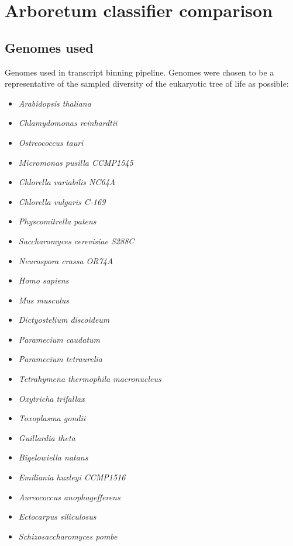 \section{Arboretum classifier comparison}

\subsection{Genomes used}\label{sec:appen_genomes}

Genomes used in transcript binning pipeline.
Genomes were chosen to be a representative of the sampled diversity of the 
eukaryotic tree of life as possible:
\begin{itemize}
    \item		\textit{Arabidopsis thaliana} 
    \item		\textit{Chlamydomonas reinhardtii} 
    \item		\textit{Ostreococcus tauri} 
    \item		\textit{Micromonas pusilla CCMP1545}   
    \item		\textit{Chlorella variabilis NC64A} 
    \item		\textit{Chlorella vulgaris C-169} 
    \item		\textit{Physcomitrella patens} 
    \item		\textit{Saccharomyces cerevisiae S288C}  
    \item		\textit{Neurospora crassa OR74A}
    \item		\textit{Homo sapiens}
    \item		\textit{Mus musculus}
    \item		\textit{Dictyostelium discoideum}
    \item		\textit{Paramecium caudatum}
    \item		\textit{Paramecium tetraurelia}
    \item		\textit{Tetrahymena thermophila macronucleus}
    \item		\textit{Oxytricha trifallax}
    \item		\textit{Toxoplasma gondii}
    \item		\textit{Guillardia theta}
    \item		\textit{Bigelowiella natans}
    \item		\textit{Emiliania huxleyi CCMP1516}
    \item		\textit{Aureococcus anophagefferens}
    \item		\textit{Ectocarpus siliculosus}
    \item		\textit{Schizosaccharomyces pombe}

\end{itemize}
